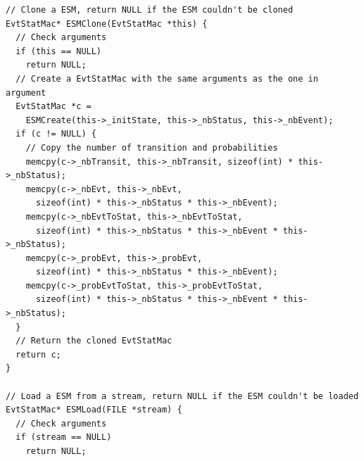 \documentclass[12pt, a4paper]{article}
\begin{document}
\begin{scriptsize}
\begin{ttfamily}
\begin{lstlisting}
// Clone a ESM, return NULL if the ESM couldn't be cloned
EvtStatMac* ESMClone(EvtStatMac *this) {
  // Check arguments
  if (this == NULL) 
    return NULL;
  // Create a EvtStatMac with the same arguments as the one in argument
  EvtStatMac *c = 
    ESMCreate(this->_initState, this->_nbStatus, this->_nbEvent);
  if (c != NULL) {
    // Copy the number of transition and probabilities
    memcpy(c->_nbTransit, this->_nbTransit, sizeof(int) * this->_nbStatus);
    memcpy(c->_nbEvt, this->_nbEvt, 
      sizeof(int) * this->_nbStatus * this->_nbEvent);
    memcpy(c->_nbEvtToStat, this->_nbEvtToStat, 
      sizeof(int) * this->_nbStatus * this->_nbEvent * this->_nbStatus);
    memcpy(c->_probEvt, this->_probEvt, 
      sizeof(int) * this->_nbStatus * this->_nbEvent);
    memcpy(c->_probEvtToStat, this->_probEvtToStat, 
      sizeof(int) * this->_nbStatus * this->_nbEvent * this->_nbStatus);
  }
  // Return the cloned EvtStatMac
  return c;
}

// Load a ESM from a stream, return NULL if the ESM couldn't be loaded
EvtStatMac* ESMLoad(FILE *stream) {
  // Check arguments
  if (stream == NULL) 
    return NULL;


\end{lstlisting}
\end{ttfamily}
\end{scriptsize}
\end{document}
